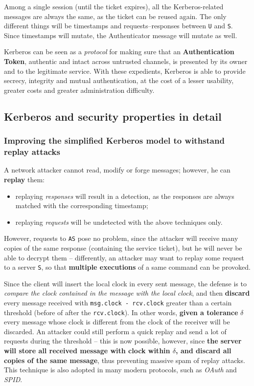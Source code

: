 \documentclass[10pt]{extbook}
\begin{document}
Among a single session (until the ticket expires), all the Kerberos\--related
messages are always the same, as the ticket can be reused again. The only
different things will be timestamps and requests\---responses between
\texttt{U} and \texttt{S}. Since timestamps will mutate, the Authenticator
message will mutate as well.

Kerberos can be seen as a \emph{protocol} for making sure that an
\textbf{Authentication Token}, authentic and intact across untrusted channels,
is presented by its owner and to the legitimate service. With these expedients,
Kerberos is able to provide secrecy, integrity and mutual authentication, at
the cost of a lesser usability, greater costs and greater administration
difficulty.


\subsection{Kerberos and security properties in detail}
\subsubsection{Improving the simplified Kerberos model to withstand replay attacks}

A network attacker cannot read, modify or forge messages; however, he can
\textbf{replay} them:
\begin{itemize}
    \item replaying \emph{responses} will result in a detection, as the
        responses are always matched with the corresponding timestamp;
    \item replaying \emph{requests} will be undetected with the above
        techniques only.
\end{itemize}

However, requests to \texttt{AS} pose no problem, since the attacker will
receive many copies of the same response (containing the service ticket), but
he will never be able to decrypt them -- differently, an attacker may want to
replay some request to a server \texttt{S}, so that \textbf{multiple
executions} of a same command can be provoked.

Since the client will insert the local clock in every sent message, the defense
is to \emph{compare the clock contained in the message with the local clock},
and then \textbf{discard} every message received with \texttt{msg.clock -
rcv.clock} greater than a certain threshold (before of after the
\texttt{rcv.clock}). In other words, \textbf{given a tolerance} $\delta$ every
message whose clock is different from the clock of the receiver will be
discarded. An attacker could still perform a quick replay and send a lot of
requests during the threshold -- this is now possible, however, since
\textbf{the server will store all received message with clock within $\delta$,
and discard all copies of the same message}, thus preventing massive spam of
replay attacks. This technique is also adopted in many modern protocols, such
as \emph{OAuth} and \emph{SPID}.
\end{document}
